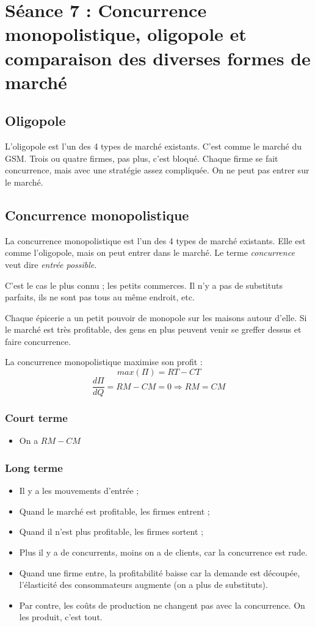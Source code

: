 \section{Séance 7 : Concurrence monopolistique, oligopole et comparaison des diverses formes de marché}


\subsection{Oligopole}
L'oligopole est l'un des 4 types de marché existants. C'est comme le marché du GSM. Trois ou quatre firmes, pas plus, c'est bloqué. Chaque firme se fait concurrence, mais avec une stratégie assez compliquée. On ne peut pas entrer sur le marché.


\subsection{Concurrence monopolistique}
La concurrence monopolistique est l'un des 4 types de marché existants. Elle est comme l'oligopole, mais on peut entrer dans le marché. Le terme \textit{concurrence} veut dire \textit{entrée possible}.

C'est le cas le plus connu ; les petits commerces. Il n'y a pas de substituts parfaits, ils ne sont pas tous au même endroit, etc.

Chaque épicerie a un petit pouvoir de monopole sur les maisons autour d'elle. Si le marché est très profitable, des gens en plus peuvent venir se greffer dessus et faire concurrence.

La concurrence monopolistique maximise son profit :
$$max( \Pi ) = RT - CT$$
$$\frac{d\Pi}{dQ} = RM - CM = 0 \Rightarrow RM = CM$$


\subsubsection{Court terme}
\begin{itemize}
	\item On a $RM - CM$
\end{itemize}

\subsubsection{Long terme}
\begin{itemize}
	\item Il y a les mouvements d'entrée ;
	\item Quand le marché est profitable, les firmes entrent ;
	\item Quand il n'est plus profitable, les firmes sortent ;
	\item Plus il y a de concurrents, moins on a de clients, car la concurrence est rude.
	\item Quand une firme entre, la profitabilité baisse car la demande est découpée, l'élasticité des consommateurs augmente (on a plus de substituts).
	\item Par contre, les coûts de production ne changent pas avec la concurrence. On les produit, c'est tout.
\end{itemize}

